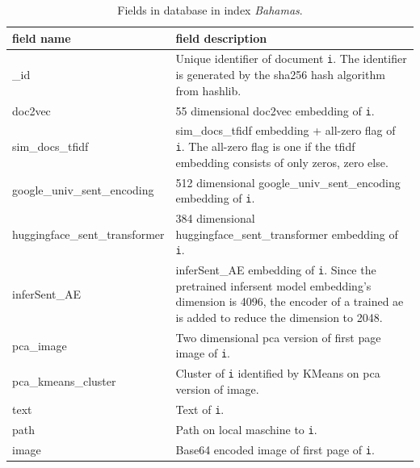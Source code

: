 \begin{table}[]
    \caption{Fields in \databaseName{} database in index \textit{Bahamas}.}
    \begin{tabular}{|
    >{\columncolor[HTML]{EFEFEF}}l |p{}|}
    \hline
    \cellcolor[HTML]{C0C0C0}\textbf{field name} & \cellcolor[HTML]{C0C0C0}\textbf{field description}                                     \\ \hline
    \_id                                        & Unique identifier of document \texttt{i}. The identifier is generated by the sha256 hash algorithm from hashlib.\\ \hline
    doc2vec                                     & 55 dimensional doc2vec embedding of \texttt{i}.                                                          \\ \hline
    sim\_docs\_tfidf                            & sim\_docs\_tfidf embedding + all-zero flag of \texttt{i}. The all-zero flag is one if the \ac{tfidf} embedding consists of only zeros, zero else.\\ \hline
    google\_univ\_sent\_encoding                & 512 dimensional google\_univ\_sent\_encoding embedding of \texttt{i}.                                     \\ \hline
    huggingface\_sent\_transformer              & 384 dimensional huggingface\_sent\_transformer embedding of \texttt{i}.                                  \\ \hline
    inferSent\_AE                               & inferSent\_AE embedding of \texttt{i}. Since the pretrained infersent model embedding's dimension is 4096, the encoder of a trained \ac{ae} is added to reduce the dimension to 2048.                                                    \\ \hline
    pca\_image                                  & Two dimensional \ac{pca} version of first page image of \texttt{i}.                      \\ \hline
    pca\_kmeans\_cluster                        & Cluster of \texttt{i} identified by KMeans on \ac{pca} version of image.                 \\ \hline
    text                                        & Text of \texttt{i}.                                                                       \\ \hline
    path                                        & Path on local maschine to \texttt{i}.                                                     \\ \hline
    image                                       & Base64 encoded image of first page of \texttt{i}.                                                        \\ \hline
    \end{tabular}
    \label{tbl:Elasticsearch-fields}
\end{table}

